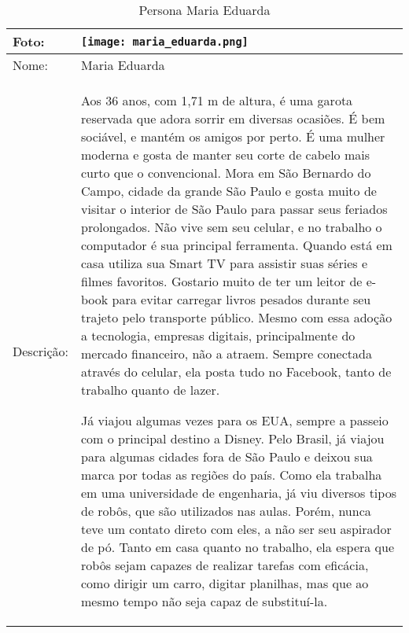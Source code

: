 \begin{table}[!ht]
	\caption{Persona Maria Eduarda}
	\label{tab:mariaeduarda}
	\centering
	\begin{tabular}{ m{2 cm} | m{13cm} }
		\hline
		Foto: & \rule{0cm}{2.7cm} \texttt{[image: maria\_eduarda.png]} \\
		\hline
		Nome: & Maria Eduarda \\
		\hline
		Descrição: & Aos 36 anos, com 1,71 m de altura, é uma garota reservada que adora sorrir em diversas ocasiões. É bem sociável, e mantém os amigos por perto. É uma mulher moderna e gosta de manter seu corte de cabelo mais curto que o convencional. Mora em São Bernardo do Campo, cidade da grande São Paulo e gosta muito de visitar o interior de São Paulo para passar seus feriados prolongados. Não vive sem seu celular, e no trabalho o computador é sua principal ferramenta. Quando está em casa utiliza sua Smart TV para assistir suas séries e filmes favoritos. Gostario muito de ter um leitor de e-book para evitar carregar livros pesados durante seu trajeto pelo transporte público. Mesmo com essa adoção a tecnologia, empresas digitais, principalmente do mercado financeiro, não a atraem. Sempre conectada através do celular, ela posta tudo no Facebook, tanto de trabalho quanto de lazer.

		Já viajou algumas vezes para os EUA, sempre a passeio com o principal destino a Disney. Pelo Brasil, já viajou para algumas cidades fora de São Paulo e deixou sua marca por todas as regiões do país. Como ela trabalha em uma universidade de engenharia, já viu diversos tipos de robôs, que são utilizados nas aulas. Porém, nunca teve um contato direto com eles, a não ser seu aspirador de pó. Tanto em casa quanto no trabalho, ela espera que robôs sejam capazes de realizar tarefas com eficácia, como dirigir um carro, digitar planilhas, mas que ao mesmo tempo não seja capaz de substituí-la.\\
		\hline
	\end{tabular}
\end{table}

